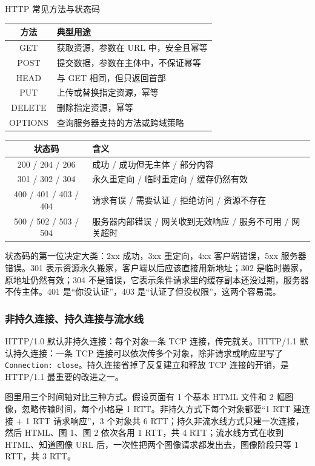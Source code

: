 \begin{tablebox}{HTTP 常见方法与状态码}
\centering
\begin{tabularx}{\linewidth}{|c|X|}
\hline
\textbf{方法} & \textbf{典型用途} \\
\hline
GET & 获取资源，参数在 URL 中，安全且幂等 \\
POST & 提交数据，参数在主体中，不保证幂等 \\
HEAD & 与 GET 相同，但只返回首部 \\
PUT & 上传或替换指定资源，幂等 \\
DELETE & 删除指定资源，幂等 \\
OPTIONS & 查询服务器支持的方法或跨域策略 \\
\hline
\end{tabularx}

\vspace{4pt}
\begin{tabularx}{\linewidth}{|c|X|}
\hline
\textbf{状态码} & \textbf{含义} \\
\hline
200 / 204 / 206 & 成功 / 成功但无主体 / 部分内容 \\
301 / 302 / 304 & 永久重定向 / 临时重定向 / 缓存仍然有效 \\
400 / 401 / 403 / 404 & 请求有误 / 需要认证 / 拒绝访问 / 资源不存在 \\
500 / 502 / 503 / 504 & 服务器内部错误 / 网关收到无效响应 / 服务不可用 / 网关超时 \\
\hline
\end{tabularx}
\end{tablebox}

状态码的第一位决定大类：2xx 成功，3xx 重定向，4xx 客户端错误，5xx 服务器错误。301 表示资源永久搬家，客户端以后应该直接用新地址；302 是临时搬家，原地址仍然有效；304 不是错误，它表示条件请求里的缓存副本还没过期，服务器不传主体。401 是“你没认证”，403 是“认证了但没权限”，这两个容易混。

\subsubsection{非持久连接、持久连接与流水线}

HTTP/1.0 默认非持久连接：每个对象一条 TCP 连接，传完就关。HTTP/1.1 默认持久连接：一条 TCP 连接可以依次传多个对象，除非请求或响应里写了 \texttt{Connection: close}。持久连接省掉了反复建立和释放 TCP 连接的开销，是 HTTP/1.1 最重要的改进之一。

图里用三个时间轴对比三种方式。假设页面有 1 个基本 HTML 文件和 2 幅图像，忽略传输时间，每个小格是 1 RTT。非持久方式下每个对象都要“1 RTT 建连接 + 1 RTT 请求响应”，3 个对象共 6 RTT；持久非流水线方式只建一次连接，然后 HTML、图 1、图 2 依次各用 1 RTT，共 4 RTT；流水线方式在收到 HTML、知道图像 URL 后，一次性把两个图像请求都发出去，图像阶段只等 1 RTT，共 3 RTT。

